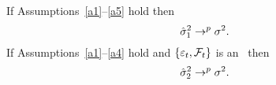 If Assumptions~\ref{a1}--\ref{a5} hold then
\begin{equation*}
  \hat\sigma_1^2 \to^p \sigma^2.
\end{equation*}
If Assumptions~\ref{a1}--\ref{a4} hold and $\{\varepsilon_{t},
\mathcal{F}_t\}$ is an \mds\ then
\begin{equation*}
   \hat\sigma_2^2 \to^p \sigma^2.
\end{equation*}
